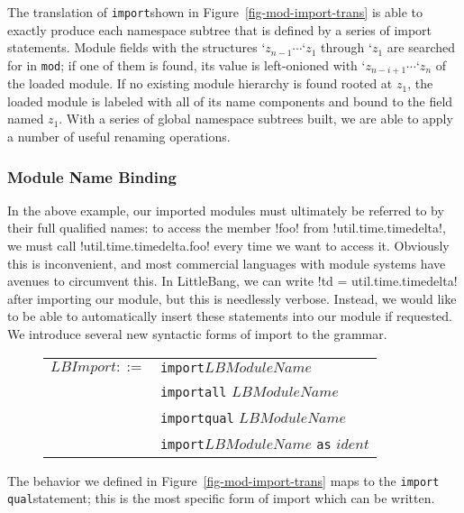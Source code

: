 \documentclass{llncs}
\newcommand{\lbimport}{\texttt{import}\;}
\newcommand{\lbimportq}{\texttt{import qual}\;}
\begin{document}
\indent The translation of \lbimport shown in Figure~\ref{fig-mod-import-trans} is able to exactly produce each namespace subtree that is defined by a series of import statements. Module fields with the structures $\texttt{`}z_{n-1} \cdots \texttt{`} z_1$ through $\texttt{`} z_1$ are searched for in \texttt{mod}; if one of them is found, its value is left-onioned with $\texttt{`}z_{n-i+1} \cdots \texttt{`}z_n$ of the loaded module. If no existing module hierarchy is found rooted at $z_1$, the loaded module is labeled with all of its name components and bound to the field named $z_1$. With a series of global namespace subtrees built, we are able to apply a number of useful renaming operations.
\subsubsection{Module Name Binding}
\label{sss-mod-name-binding}
In the above example, our imported modules must ultimately be referred to by their full qualified names: to access the member \lbil!foo! from \lbil!util.time.timedelta!, we must call \lbil!util.time.timedelta.foo! every time we want to access it. Obviously this is inconvenient, and most commercial languages with module systems have avenues to circumvent this. In LittleBang, we can write \lbil!td = util.time.timedelta! after importing our module, but this is needlessly verbose. Instead, we would like to be able to automatically insert these statements into our module if requested. We introduce several new syntactic forms of import to the grammar.\\
\begin{figure}[h]
\begin{tabular}{l l @{ $|$}}
	$LBImport ::= $ & \lbimport $LBModuleName$\\
	& \lbimport \texttt{all} $LBModuleName$\\
	& \lbimport \texttt{qual} $LBModuleName$\\
	& \lbimport $LBModuleName$ \texttt{as} $ident$\\
\end{tabular}
\end{figure}
The behavior we defined in Figure~\ref{fig-mod-import-trans} maps to the \lbimportq statement; this is the most specific form of import which can be written. 
\end{document}
